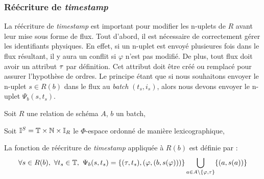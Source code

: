 \subsubsection{Réécriture de \textit{timestamp}}
La réécriture de \textit{timestamp} est important pour modifier les n-uplets de $R$ avant leur mise sous forme de flux. Tout d'abord, il est nécessaire de correctement gérer les identifiants physiques. En effet, si un n-uplet est envoyé plusieures fois dans le flux résultant, il y aura un conflit si $\varphi$ n'est pas modifié. De plus, tout flux doit avoir un attribut $\tau$ par définition. Cet attribut doit être créé ou remplacé pour assurer l'hypothèse de ordres. Le principe étant que si nous souhaitons envoyer le n-uplet $s\in R(b)$ dans le flux au \textit{batch} $(t_s,i_s)$, alors nous devons envoyer le n-uplet $\Psi_b(s,t_s)$.
\begin{defi}
    Soit $R$ une relation de schéma $A$, $b$ un batch,

    Soit $\mathbb{I}^S = \mathbb{T}\times\mathbb{N}\times \mathbb{I}_R$ le $\Phi$-espace ordonné de manière lexicographique,

    La fonction de réécriture de \textit{timestamp} appliquée à $R(b)$ est définie par : 
$$\forall s\in R(b), \ \forall t_s\in\T, \ \Psi_b(s,t_s) = \{(\t,t_s), (\varphi, (b,s(\varphi)))\}\bigcup_{a\in A\backslash\{\varphi,\t\}}\{(a,s(a))\}$$
\end{defi}

